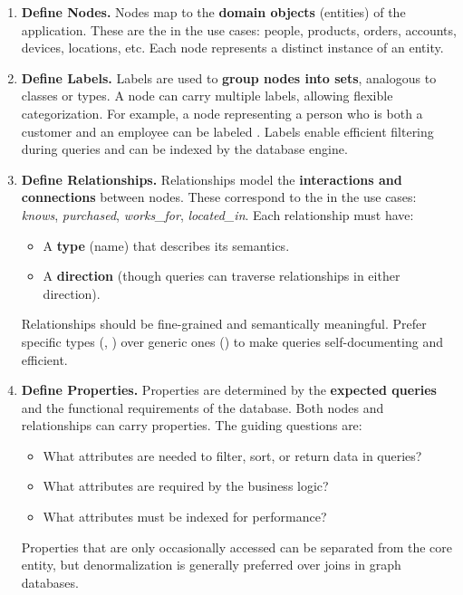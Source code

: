 \begin{enumerate}
    \item \textbf{Define Nodes.} Nodes map to the \textbf{domain objects} (entities) of the application. These are the  in the use cases: people, products, orders, accounts, devices, locations, etc. Each node represents a distinct instance of an entity.

    \item \textbf{Define Labels.} Labels are used to \textbf{group nodes into sets}, analogous to classes or types. A node can carry multiple labels, allowing flexible categorization. For example, a node representing a person who is both a customer and an employee can be labeled . Labels enable efficient filtering during queries and can be indexed by the database engine.

    \item \textbf{Define Relationships.} Relationships model the \textbf{interactions and connections} between nodes. These correspond to the  in the use cases: \emph{knows}, \emph{purchased}, \emph{works\_for}, \emph{located\_in}. Each relationship must have:
    \begin{itemize}
        \item A \textbf{type} (name) that describes its semantics.
        \item A \textbf{direction} (though queries can traverse relationships in either direction).
    \end{itemize}
    Relationships should be fine-grained and semantically meaningful. Prefer specific types (, ) over generic ones () to make queries self-documenting and efficient.

    \item \textbf{Define Properties.} Properties are determined by the \textbf{expected queries} and the functional requirements of the database. Both nodes and relationships can carry properties. The guiding questions are:
    \begin{itemize}
        \item What attributes are needed to filter, sort, or return data in queries?
        \item What attributes are required by the business logic?
        \item What attributes must be indexed for performance?
    \end{itemize}
    Properties that are only occasionally accessed can be separated from the core entity, but denormalization is generally preferred over joins in graph databases.
\end{enumerate}

